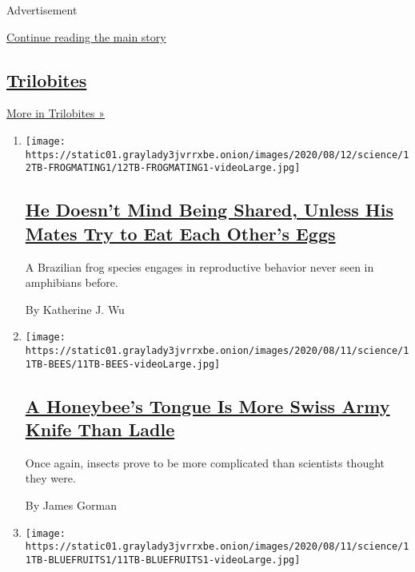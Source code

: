 Advertisement

\protect\hyperlink{after-mid1}{Continue reading the main story}

\hypertarget{trilobites-3}{%
\subsection{\texorpdfstring{\href{/column/trilobites}{Trilobites}}{Trilobites}}\label{trilobites-3}}

\href{/column/trilobites}{More in Trilobites »}

\begin{enumerate}
\def\labelenumi{\arabic{enumi}.}
\item
  \texttt{[image: https://static01.graylady3jvrrxbe.onion/images/2020/08/12/science/12TB-FROGMATING1/12TB-FROGMATING1-videoLarge.jpg]}

  \hypertarget{he-doesnt-mind-being-shared-unless-his-mates-try-to-eat-each-others-eggs}{%
  \subsection{\texorpdfstring{\href{/2020/08/12/science/frog-group-fidelity.html}{He
  Doesn't Mind Being Shared, Unless His Mates Try to Eat Each Other's
  Eggs}}{He Doesn't Mind Being Shared, Unless His Mates Try to Eat Each Other's Eggs}}\label{he-doesnt-mind-being-shared-unless-his-mates-try-to-eat-each-others-eggs}}

  A Brazilian frog species engages in reproductive behavior never seen
  in amphibians before.

  By Katherine J. Wu
\item
  \texttt{[image: https://static01.graylady3jvrrxbe.onion/images/2020/08/11/science/11TB-BEES/11TB-BEES-videoLarge.jpg]}

  \hypertarget{a-honeybees-tongue-is-more-swiss-army-knife-than-ladle}{%
  \subsection{\texorpdfstring{\href{/2020/08/11/science/honeybees-drink-video.html}{A
  Honeybee's Tongue Is More Swiss Army Knife Than
  Ladle}}{A Honeybee's Tongue Is More Swiss Army Knife Than Ladle}}\label{a-honeybees-tongue-is-more-swiss-army-knife-than-ladle}}

  Once again, insects prove to be more complicated than scientists
  thought they were.

  By James Gorman
\item
  \texttt{[image: https://static01.graylady3jvrrxbe.onion/images/2020/08/11/science/11TB-BLUEFRUITS1/11TB-BLUEFRUITS1-videoLarge.jpg]}


\end{enumerate}
